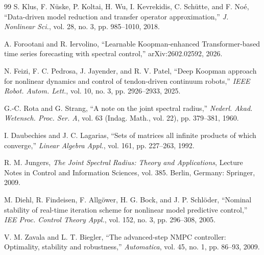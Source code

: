\documentclass[journal]{IEEEtran}
\begin{document}
\begin{thebibliography}{99}
S. Klus, F. N\"uske, P. Koltai, H. Wu, I. Kevrekidis, C. Sch\"utte, and F. No\'e, ``Data-driven model reduction and transfer operator approximation,'' \emph{J. Nonlinear Sci.}, vol. 28, no. 3, pp. 985--1010, 2018.

A. Forootani and R. Iervolino, ``Learnable Koopman-enhanced Transformer-based time series forecasting with spectral control,'' arXiv:2602.02592, 2026.

N. Feizi, F. C. Pedrosa, J. Jayender, and R. V. Patel, ``Deep Koopman approach for nonlinear dynamics and control of tendon-driven continuum robots,'' \emph{IEEE Robot. Autom. Lett.}, vol. 10, no. 3, pp. 2926--2933, 2025.

G.-C. Rota and G. Strang, ``A note on the joint spectral radius,'' \emph{Nederl. Akad. Wetensch. Proc. Ser. A}, vol. 63 (Indag. Math., vol. 22), pp. 379--381, 1960.

I. Daubechies and J. C. Lagarias, ``Sets of matrices all infinite products of which converge,'' \emph{Linear Algebra Appl.}, vol. 161, pp. 227--263, 1992.

R. M. Jungers, \emph{The Joint Spectral Radius: Theory and Applications}, Lecture Notes in Control and Information Sciences, vol. 385. Berlin, Germany: Springer, 2009.

M. Diehl, R. Findeisen, F. Allg\"ower, H. G. Bock, and J. P. Schl\"oder, ``Nominal stability of real-time iteration scheme for nonlinear model predictive control,'' \emph{IEE Proc. Control Theory Appl.}, vol. 152, no. 3, pp. 296--308, 2005.

V. M. Zavala and L. T. Biegler, ``The advanced-step NMPC controller: Optimality, stability and robustness,'' \emph{Automatica}, vol. 45, no. 1, pp. 86--93, 2009.

\end{thebibliography}
\end{document}
